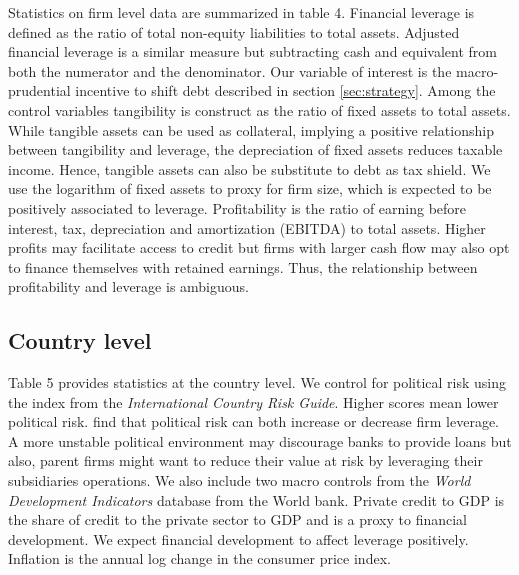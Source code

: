 \documentclass[12pt]{article}
\begin{document}
	Statistics on firm level data are summarized in table 4. Financial leverage is defined as the ratio of total non-equity liabilities to total assets. Adjusted financial leverage is a similar measure but subtracting cash and equivalent from both the numerator and the denominator. Our variable of interest is the macro-prudential incentive to shift debt described in section \ref{sec:strategy}. Among the control variables tangibility is construct as the ratio of fixed assets to total assets. While tangible assets can be used as collateral, implying a positive relationship between tangibility and leverage, the depreciation of fixed assets reduces taxable income. Hence, tangible assets can also be substitute to debt as tax shield. We use the logarithm of fixed assets to proxy for firm size, which is expected to be positively associated to leverage. Profitability is the ratio of earning before interest, tax, depreciation and amortization (EBITDA) to total assets. Higher profits may facilitate access to credit but firms with larger cash flow may also opt to finance themselves with retained earnings. Thus, the relationship between profitability and leverage is ambiguous. 
	\subsection{Country level} \label{subsec:country}
	Table 5 provides statistics at the country level. We control for political risk using the index from the \textit{International Country Risk Guide}. Higher scores mean lower political risk. \cite*{kesternich2010afraid} find that political risk can both increase or decrease firm leverage. A more unstable political environment may discourage banks to provide loans but also, parent firms might want to reduce their value at risk by leveraging their subsidiaries operations. We also include two macro controls from the \textit{World Development Indicators} database from the World bank. Private credit to GDP is the share of credit to the private sector to GDP and is a proxy to financial development. We expect financial development to affect leverage positively. Inflation is the annual log change in the consumer price index.     	
	     
\end{document}
